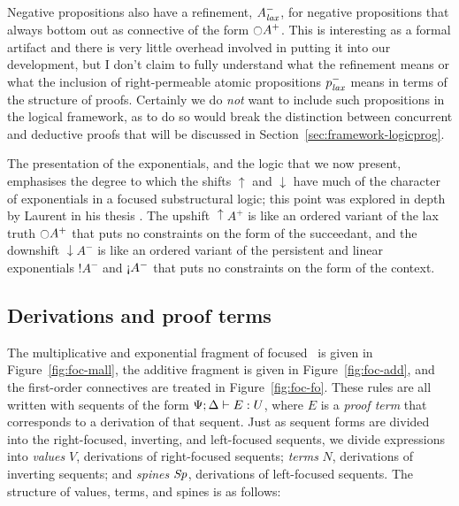 Negative propositions also have a refinement, $A^-_{\it lax}$, for
negative propositions that always bottom out as connective 
of the form
${\ocircle}A^+$.  This is interesting as a formal artifact and there
is very little overhead involved in putting it into our development,
but I don't claim to fully understand what the refinement means or
what the inclusion of right-permeable atomic propositions $p^-_{\it lax}$
means in terms of the structure of proofs. Certainly we do {\it not}
want to include such propositions in the logical framework, as to do
so would break the distinction between concurrent and deductive proofs
that will be discussed in Section~\ref{sec:framework-logicprog}.

The presentation of the exponentials, and the logic that we now present,
emphasises the degree to which the shifts ${\uparrow}$ and
${\downarrow}$ have much of the character of exponentials in a focused
substructural logic; this point was explored in depth by Laurent in
his thesis \cite{laurent02etude}. The upshift ${\uparrow}A^+$ is like
an ordered variant of the lax truth ${\ocircle}A^+$ that puts no
constraints on the form of the succeedant, and the downshift
${\downarrow}A^-$ is like an ordered variant of the persistent and
linear exponentials ${!}A^-$ and ${\gnab}A^-$ that puts no constraints
on the form of the context.

\subsection{Derivations and proof terms}
\label{sec:ord-proof-terms}





The multiplicative and exponential fragment of focused \ollll~is given
in Figure~\ref{fig:foc-mall}, the additive fragment is given in
Figure~\ref{fig:foc-add}, and the first-order connectives are treated
in Figure~\ref{fig:foc-fo}. These rules are all written with sequents
of the form ${\Psi}; {\Delta} \vdash {E} : {U}$, where $E$ is a {\it proof
  term} that corresponds to a derivation of that sequent. Just
as sequent forms are divided into the right-focused, inverting, and
left-focused sequents, we divide expressions into {\it values} $V$,
derivations of right-focused sequents; {\it terms} $N$,
derivations of inverting sequents; and {\it spines} ${\it Sp}$,
derivations of left-focused sequents. The structure of
values, terms, and spines is as follows:


